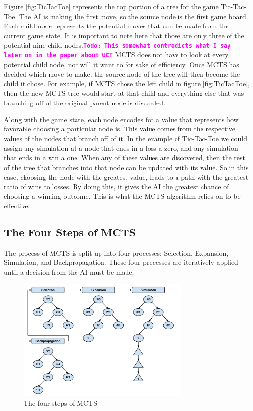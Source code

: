 \documentclass{sig-alternate}
\newcommand{\comment}[1]{{\bf \tt  {#1}}}
\newcommand{\todo}[1]{\textcolor{magenta}{\comment{Todo: {#1}}}}
\begin{document}
Figure \ref{fig:TicTacToe} represents the top portion of a tree for the game Tic-Tac-Toe. The AI is making the first move, so the source node is the first game board. Each child node represents the potential moves that can be made from the current game state. It is important to note here that those are only three of the potential nine child nodes.\todo{This somewhat contradicts what I say later on in the paper about UCT} MCTS does not have to look at every potential child node, nor will it want to for sake of efficiency. Once MCTS has decided which move to make, the source node of the tree will then become the child it chose. For example, if MCTS chose the left child in figure \ref{fig:TicTacToe}, then the new MCTS tree would start at that child and everything else that was branching off of the original parent node is discarded.

Along with the game state, each node encodes for a value that represents how favorable choosing a particular node is. This value comes from the respective values of the nodes that branch off of it. In the example of Tic-Tac-Toe we could assign any simulation at a node that ends in a loss a zero, and any simulation that ends in a win a one. When any of these values are discovered, then the rest of the tree that branches into that node can be updated with its value. So in this case, choosing the node with the greatest value, leads to a path with the greatest ratio of wins to losses. By doing this, it gives the AI the greatest chance of choosing a winning outcome. This is what the MCTS algorithm relies on to be effective.

\subsection{The Four Steps of MCTS}
The process of MCTS is split up into four processes: Selection, Expansion, Simulation, and Backpropagation. These four processes are iteratively applied until a decision from the AI must be made.

\begin{figure}[h]
	\includegraphics[width=8.5cm]{MCTSFourStepProcess.pdf}
	\centering
	\caption{The four steps of MCTS}
	\label{fig:FourSteps}
\end{figure}
\end{document}

